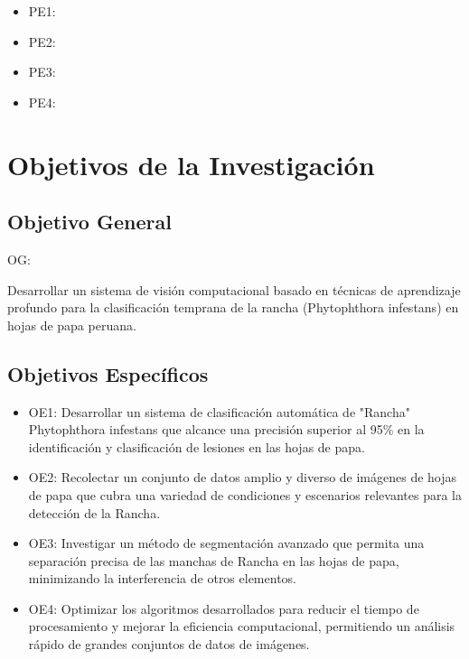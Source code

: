 \begin{itemize}
	\item PE1: {\Pbone}
	\item PE2: {\Pbtwo}
	\item PE3: {\Pbthree}
	\item PE4: {\Pbfour}
\end{itemize}

\section{Objetivos de la Investigación}

\subsection{Objetivo General}
OG: \newcommand{\ObjetivoGeneral}{
	Desarrollar un sistema de visión computacional basado en técnicas de aprendizaje profundo para la clasificación temprana de la rancha (Phytophthora infestans) en hojas de papa peruana.
}
\ObjetivoGeneral

\subsection{Objetivos Específicos}
\newcommand{\Objone}{
Desarrollar un sistema de clasificación automática de "Rancha" Phytophthora infestans que alcance una precisión superior al 95\% en la identificación y clasificación de lesiones en las hojas de papa.
}

\newcommand{\Objtwo}{
Recolectar un conjunto de datos amplio y diverso de imágenes de hojas de papa que cubra una variedad de condiciones y escenarios relevantes para la detección de la Rancha.
}

\newcommand{\Objthree}{
Investigar un método de segmentación avanzado que permita una separación precisa de las manchas de Rancha en las hojas de papa, minimizando la interferencia de otros elementos.
}

\newcommand{\Objfour}{
Optimizar los algoritmos desarrollados para reducir el tiempo de procesamiento y mejorar la eficiencia computacional, permitiendo un análisis rápido de grandes conjuntos de datos de imágenes.
}

\begin{itemize}
	\item OE1: {\Objone}
	\item OE2: {\Objtwo}
	\item OE3: {\Objthree}
	\item OE4: {\Objfour}
\end{itemize}

